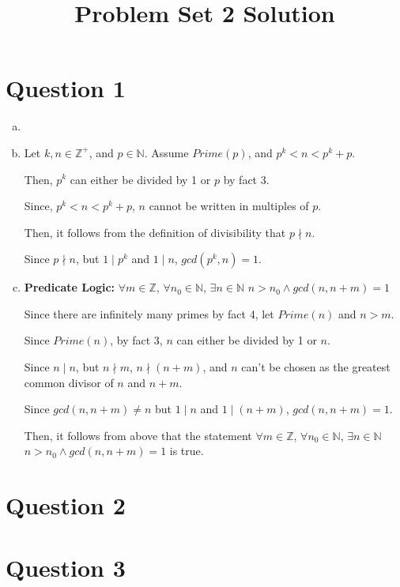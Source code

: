 \documentclass[12pt]{article}
\begin{document}
\title{Problem Set 2 Solution}
\maketitle

\section*{Question 1}
\begin{enumerate}[a.]
    \item

    \item

    Let $k,n \in \mathbb{Z}^{+}$, and $p \in \mathbb{N}$. Assume $Prime(p)$, and
    $p^k < n < p^k + p$.

    \bigskip

    Then, $p^k$ can either be divided by 1 or $p$ by fact 3.

    \bigskip

    Since, $p^k < n < p^k + p$, $n$ cannot be written in multiples of $p$.

    \bigskip

    Then, it follows from the definition of divisibility that $p \nmid n$.

    \bigskip

    Since $p \nmid n$, but $1 \mid p^k$ and $1 \mid n$, $gcd(p^k, n) = 1$.

    \item

    \textbf{Predicate Logic:} $\forall m \in \mathbb{Z}$, $\forall n_0 \in \mathbb{N}$,
    $\exists n \in \mathbb{N}$ $n > n_0 \land gcd(n, n+m) = 1$

    \bigskip

    Since there are infinitely many primes by fact 4, let $Prime(n)$ and $n > m$.

    \bigskip

    Since $Prime(n)$, by fact 3, $n$ can either be divided by 1 or $n$.

    \bigskip

    Since $n \mid n$, but $n \nmid m$, $n \nmid (n+m)$, and $n$ can't be chosen
    as the greatest common divisor of $n$ and $n+m$.

    \bigskip

    Since $gcd(n,n+m) \neq n$ but $1 \mid n$ and $1 \mid (n+m)$, $gcd(n,n+m)=1$.

    \bigskip

    Then, it follows from above that the statement $\forall m \in \mathbb{Z}$,
    $\forall n_0 \in \mathbb{N}$, $\exists n \in \mathbb{N}$ $n > n_0 \land
    gcd(n, n+m) = 1$ is true.

\end{enumerate}

\section*{Question 2}

\section*{Question 3}
\end{document}
